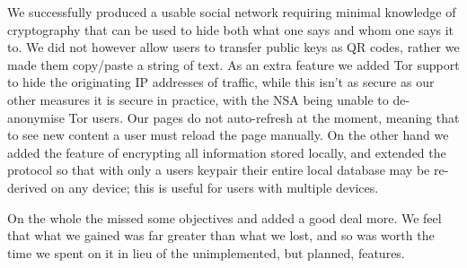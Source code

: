 We successfully produced a usable social network requiring minimal knowledge of
cryptography that can be used to hide both what one says and whom one says it
to. We did not however allow users to transfer public keys as QR codes, rather
we made them copy/paste a string of text. As an extra feature we added Tor
support to hide the originating IP addresses of traffic, while this isn't as
secure as our other measures it is secure in practice, with the NSA being unable
to de-anonymise Tor users\cite{torStinks}. Our pages do not auto-refresh at the
moment, meaning that to see new content a user must reload the page manually.
On the other hand we added the feature of encrypting all information stored
locally, and extended the protocol so that with only a users keypair their
entire local database may be re-derived on any device; this is useful for users
with multiple devices.


On the whole the missed some objectives and added a good deal more. We feel that
what we gained was far greater than what we lost, and so was worth the time we
spent on it in lieu of the unimplemented, but planned, features.
